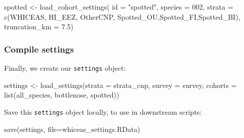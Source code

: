 \documentclass[
]{book}
\newenvironment{Shaded}{\begin{snugshade}}{\end{snugshade}}
\newcommand{\AttributeTok}[1]{\textcolor[rgb]{0.77,0.63,0.00}{#1}}
\newcommand{\FloatTok}[1]{\textcolor[rgb]{0.00,0.00,0.81}{#1}}
\newcommand{\FunctionTok}[1]{\textcolor[rgb]{0.00,0.00,0.00}{#1}}
\newcommand{\NormalTok}[1]{#1}
\newcommand{\OtherTok}[1]{\textcolor[rgb]{0.56,0.35,0.01}{#1}}
\newcommand{\StringTok}[1]{\textcolor[rgb]{0.31,0.60,0.02}{#1}}
\begin{document}
\begin{Shaded}
\begin{Highlighting}[]
\NormalTok{spotted }\OtherTok{\textless{}{-}} \FunctionTok{load\_cohort\_settings}\NormalTok{(}
  \AttributeTok{id =} \StringTok{"spotted"}\NormalTok{,}
  \AttributeTok{species =} \StringTok{\textquotesingle{}002\textquotesingle{}}\NormalTok{,}
  \AttributeTok{strata =} \FunctionTok{c}\NormalTok{(}\StringTok{\textquotesingle{}WHICEAS\textquotesingle{}}\NormalTok{, }\StringTok{\textquotesingle{}HI\_EEZ\textquotesingle{}}\NormalTok{, }\StringTok{\textquotesingle{}OtherCNP\textquotesingle{}}\NormalTok{,}
             \StringTok{\textquotesingle{}Spotted\_OU\textquotesingle{}}\NormalTok{,}\StringTok{\textquotesingle{}Spotted\_FI\textquotesingle{}}\NormalTok{,}\StringTok{\textquotesingle{}Spotted\_BI\textquotesingle{}}\NormalTok{),}
  \AttributeTok{truncation\_km =} \FloatTok{7.5}\NormalTok{)}
\end{Highlighting}
\end{Shaded}

\hypertarget{compile-settings}{%
\subsubsection*{Compile settings}\label{compile-settings}}

Finally, we create our \texttt{settings} object:

\begin{Shaded}
\begin{Highlighting}[]
\NormalTok{settings }\OtherTok{\textless{}{-}} \FunctionTok{load\_settings}\NormalTok{(}\AttributeTok{strata =}\NormalTok{ strata\_cnp,}
                          \AttributeTok{survey =}\NormalTok{ survey,}
                          \AttributeTok{cohorts =} \FunctionTok{list}\NormalTok{(all\_species,}
\NormalTok{                                         bottlenose,}
\NormalTok{                                         spotted))}
\end{Highlighting}
\end{Shaded}

Save this \texttt{settings} object locally, to use in downstream scripts:

\begin{Shaded}
\begin{Highlighting}[]
\FunctionTok{save}\NormalTok{(settings, }\AttributeTok{file=}\StringTok{\textquotesingle{}whiceas\_settings.RData\textquotesingle{}}\NormalTok{)}
\end{Highlighting}
\end{Shaded}
\end{document}
